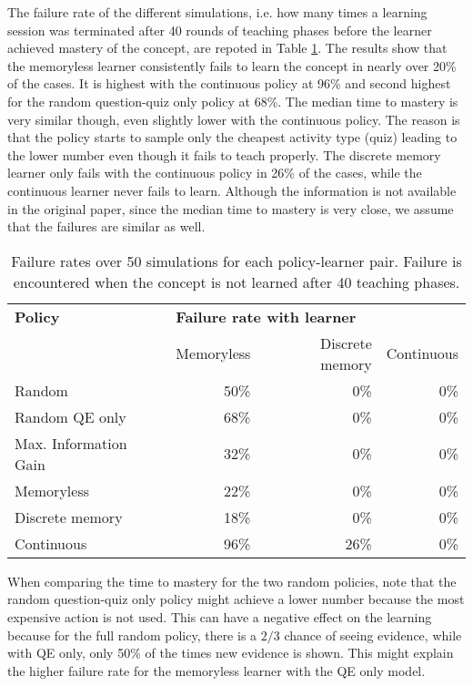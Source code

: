 The failure rate of the different simulations, i.e. how many times a learning session was terminated after 40 rounds of teaching phases before the learner achieved mastery of the concept, are repoted in Table \ref{tab:failures-t1}. 
The results show that the memoryless learner consistently fails to learn the concept in nearly over 20\% of the cases.
It is highest with the continuous policy at 96\% and second highest for the random question-quiz only policy at 68\%. The median time to mastery is very similar though, even slightly lower with the continuous policy. The reason is that the policy starts to sample only the cheapest activity type (quiz) leading to the 
lower number even though it fails to teach properly.
The discrete memory learner only fails with the continuous policy in 26\% of the cases, while the continuous learner never fails to learn.
Although the information is not available in the original paper, since the median time to mastery is very close, we assume that the failures are similar as well.


\begin{table}
    \centering
    \small
    \begin{tabular}{l|rrr}
        \hline
        \textbf{Policy} & \multicolumn{2}{l}{\textbf{Failure rate with learner}} & \\
                        & Memoryless & Discrete memory & Continuous \\
        \hline
        Random          & 50\% & 0\% & 0\% \\
        Random QE only  & 68\% & 0\% & 0\% \\
        Max. Information Gain & 32\% & 0\% & 0\% \\
        \hline
        Memoryless      & 22\% & 0\% & 0\% \\
        Discrete memory & 18\% & 0\% & 0\% \\
        Continuous      & 96\% & 26\% & 0\% \\
        \hline
    \end{tabular}
    \caption{Failure rates over 50 simulations for each policy-learner pair. Failure is encountered when the concept is not learned after 40 teaching phases.}
    \label{tab:failures-t1}
\end{table}

When comparing the time to mastery for the two random policies, note that the random question-quiz only policy might achieve a lower number because the most expensive action is not used.
This can have a negative effect on the learning because for the full random policy, there is a $2/3$ chance of seeing evidence, while with QE only, only 50\% of the times new evidence is shown. 
This might explain the higher failure rate for the memoryless learner with the QE only model.

